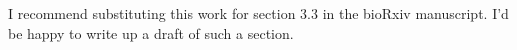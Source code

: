 \documentclass[11pt]{article}
\DeclareMathOperator*{\argmin}{argmin}
\begin{document}
I recommend substituting this work for section 3.3 in the bioRxiv manuscript. I'd be happy to write up a draft of such a section.


%
%
%
% 
% 
 




\end{document}
